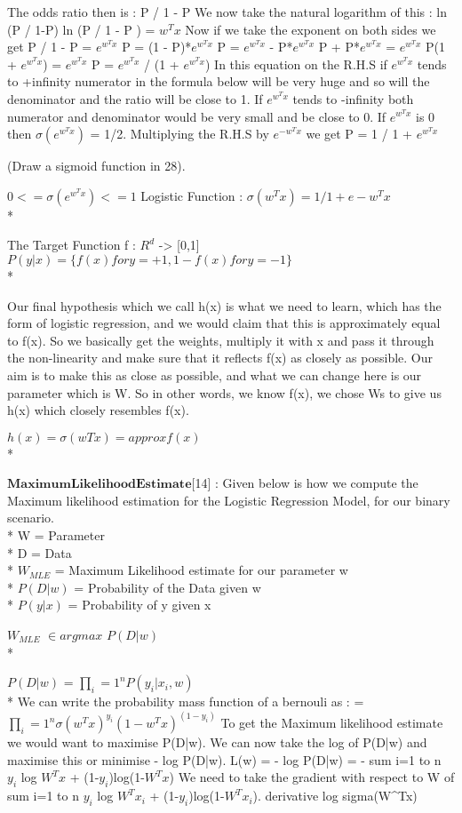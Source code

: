 The odds ratio then is : P / 1 - P 
We now take the natural logarithm of this : ln (P / 1-P)
ln (P / 1 - P ) = $w^Tx$
Now if we take the exponent on both sides we get 
P / 1 - P = $e^{w^Tx}$
P = (1 - P)*$e^{w^Tx}$
P = $e^{w^Tx}$ - P*$e^{w^Tx}$
P + P*$e^{w^Tx}$ = $e^{w^Tx}$
P(1 + $e^{w^Tx}$) = $e^{w^Tx}$
P = $e^{w^Tx}$ / (1 + $e^{w^Tx}$)
In this equation on the R.H.S if $e^{w^Tx}$ tends to +infinity numerator in the formula below will be very huge and so will the denominator and the ratio will be close to 1. If $e^{w^Tx}$ tends to -infinity both numerator and denominator would be very small and be close to 0. If $e^{w^Tx}$ is 0 then $\sigma(e^{w^Tx})$ = 1/2. 
Multiplying the R.H.S by  $e^{-w^Tx}$ we get 
P = 1 / 1 + $e^{w^Tx}$

(Draw a sigmoid function in 28). 

$0 <= \sigma(e^{w^Tx}) <= 1$
Logistic Function : $\sigma(w^Tx) = 1 / 1 + e-w^Tx$\\*

The Target Function f : $R^d$ -> [0,1]
$P(y|x) = \{f(x) for y=+1, 1 - f(x) for y=-1\}$	\\*

Our final hypothesis which we call h(x) is what we need to learn, which has the form of logistic regression,  and we would claim that this is approximately equal to f(x). So we basically get the weights, multiply it with x and pass it through the non-linearity and make sure that it reflects f(x) as closely as possible. Our aim is to make this as close as possible, and what we can change here is our parameter which is W. So in other words, we know f(x), we chose Ws to give us h(x) which closely resembles f(x). 

$h(x) = \sigma(wTx) =approx f(x)$\\*

$\mathbf{Maximum Likelihood Estimate}$[14] : Given below is how we compute the Maximum likelihood estimation for the Logistic Regression Model, for our binary scenario.\\*
W = Parameter \\*
D = Data\\*
$W_{MLE}$ = Maximum Likelihood estimate for our parameter w\\*
$P(D|w)$ = Probability of the Data given w\\*
$P(y|x)$ = Probability of y given x

$W_{MLE}$ $\in argmax$  $P(D|w)$\\*

$P(D|w)$ = $\prod_i=1^n P(y_i|x_i,w)$ \\*
We can write the probability mass function of a bernouli as : 
= $\prod_i=1^n \sigma(w^Tx)^{y_i}(1-w^Tx)^(1-y_i)$
To get the Maximum likelihood estimate we would want to maximise P(D|w). We can now take the log of P(D|w) and maximise this or minimise - log P(D|w). 
L(w) = - log P(D|w) = - sum i=1 to n $y_i$ log $W^Tx$ + (1-$y_i$)log(1-$W^Tx$)
We need to take the gradient with respect to W of sum i=1 to n $y_i$ log $W^Tx_i$ + (1-$y_i$)log(1-$W^Tx_i$). 
derivative log sigma(W^Tx) 




